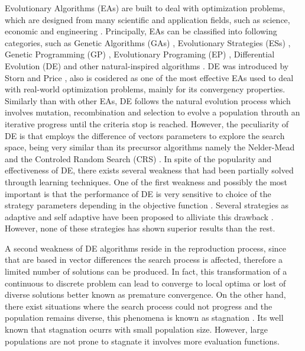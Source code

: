 Evolutionary Algorithms (EAs) are built to deal with optimization problems, which are designed from many scientific and application fields, such as science, economic and engineering \cite{noman2008differential, chakraborty2008advances}.
%
Principally, EAs can be classified into following categories, such as Genetic Algorithms (GAs) \cite{srinivas1994genetic, schwefel1977numerische} , Evolutionary Strategies (ESs) \cite{john1992holland}, Genetic Programming (GP) \cite{koza1992genetic}, Evolutionary Programing (EP) \cite{fogel1991meta}, Differential Evolution (DE) \cite{storn1997differential} and other natural-inspired algorithms \cite{das2011differential}.
%
%
DE was introduced by Storn and Price \cite{storn1997differential}, also is cosidered as one of the most effective EAs used to deal with real-world optimization problems, mainly for its convergency properties.
%
Similarly than with other EAs, DE follows the natural evolution process which involves mutation, recombination and selection to evolve a population throuth an iterative progress until the criteria stop is reached.
%
However, the peculiarity of DE is that employs the difference of vectors parameters to explore the search space, being very similar than its precursor algorithms namely the Nelder-Mead \cite{nelder1965simplex} and the Controled Random Search (CRS) \cite{price1983global}.
%
In spite of the popularity and effectiveness of DE, there exists several weakness that had been partially solved througth learning techniques.
%
One of the first weakness and possibly the most important is that the performance of DE is very sensitive to choice of the strategy parameters depending in the objective function \cite{gamperle2002parameter}.
%
Several strategies as adaptive and self adaptive have been proposed to alliviate this drawback \cite{brest2006self, zhang2009jade}.
%
However, none of these strategies has shown superior results than the rest.
%

A second weakness of DE algorithms reside in the reproduction process, since that are based in vector differences the search process is affected, therefore a limited number of solutions can be produced.
%
In fact, this transformation of a continuous to discrete problem can lead to converge to local optima or lost of diverse solutions better known as premature convergence.
%
On the other hand, there exist situations where the search process could not progress and the population remains diverse, this phenomena is known as stagnation \cite{lampinen2000stagnation}.
%
Its well known that stagnation ocurrs with small population size.
%
However, large populations are not prone to stagnate it involves more evaluation functions.

